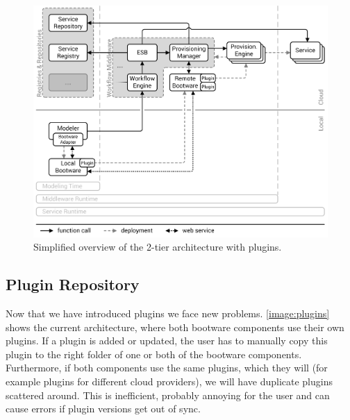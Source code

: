 \begin{figure}[!htbp]
	\centering
	\includegraphics[resolution=600]{design/assets/plugins}
	\caption{Simplified overview of the 2-tier architecture with plugins.}
	\label{image:plugins}
\end{figure}

\subsection{Plugin Repository}
\label{design:pluginrepository}

Now that we have introduced plugins we face new problems.
\autoref{image:plugins} shows the current architecture, where both bootware components use their own plugins.
If a plugin is added or updated, the user has to manually copy this plugin to the right folder of one or both of the bootware components.
Furthermore, if both components use the same plugins, which they will (for example plugins for different cloud providers), we will have duplicate plugins scattered around.
This is inefficient, probably annoying for the user and can cause errors if plugin versions get out of sync.

